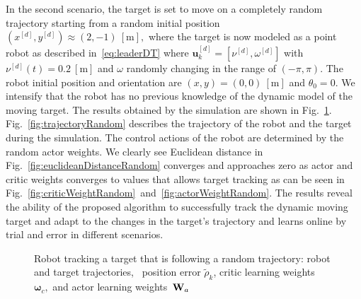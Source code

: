 \documentclass[conference]{IEEEtran}
\begin{document}
In the second scenario, the target is set to move on a completely random trajectory starting from a random initial position $(x^{[d]},y^{[d]})\approx (2,-1)~[\si{\meter}],$ where the target is now modeled as a point robot as described in~\eqref{eq:leaderDT}
where $\mathbf{u}_k^{[d]}=[\nu^{[d]},\omega^{[d]}] $ with
$\nu^{[d]}(t)=0.2~[\si{\meter}]$ and $\omega$ randomly changing in the range of
$({-\pi},{\pi}) $. The robot initial position and orientation are $(x,y) =
(0,0)~[\si{\meter}]$ and $\theta_0=0$. We intensify that the robot has no
previous knowledge of the dynamic model of the moving target. The results
obtained by the simulation are shown in Fig.~\ref{fig:performanceRandom}. Fig.~\ref{fig:trajectoryRandom} describes the trajectory of the robot and the target
during the simulation. The control actions of the robot are determined by the
random actor weights. We clearly see Euclidean distance in Fig.~\ref{fig:euclideanDistanceRandom} converges and approaches zero as actor and
critic weights converges to values that allows target tracking as can be seen in
Fig.~\ref{fig:criticWeightRandom}~and~\ref{fig:actorWeightRandom}. The results
reveal the ability of the proposed algorithm to successfully track the dynamic
moving target and adapt to the changes in the target's trajectory and learns
online by trial and error in different scenarios. %
%    
 \begin{figure}[htbp]%
  \caption[Robot tracking a target that is  following a random trajectory.]{Robot tracking a target that is  following a random trajectory:
   robot and target trajectories,~ position error $\tilde\rho_k$,  critic learning weights~$\bm{\omega}_c,$ and  actor learning weights~${\bf W}_a$}%
  \label{fig:performanceRandom}%
\end{figure}
\end{document}
